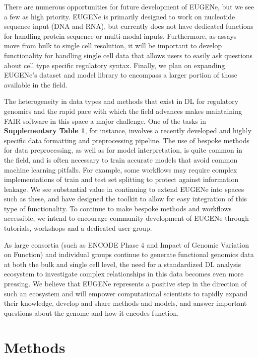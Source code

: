 There are numerous opportunities for future development of EUGENe, but we see a few as high priority. EUGENe is primarily designed to work on nucleotide sequence input (DNA and RNA), but currently does not have dedicated functions for handling protein sequence or multi-modal inputs. Furthermore, as assays move from bulk to single cell resolution, it will be important to develop functionality for handling single cell data that allows users to easily ask questions about cell type specific regulatory syntax. Finally, we plan on expanding EUGENe’s dataset and model library to encompass a larger portion of those available in the field.

The heterogeneity in data types and methods that exist in DL for regulatory genomics and the rapid pace with which the field advances makes maintaining FAIR software in this space a major challenge. One of the tasks in \textbf{Supplementary Table 1}, for instance, involves a recently developed and highly specific data formatting and preprocessing pipeline\cite{Bravo_Gonzalez-Blas2019-fq}. The use of bespoke methods for data preprocessing, as well as for model interpretation, is quite common in the field, and is often necessary to train accurate models that avoid common machine learning pitfalls\cite{Whalen2021-fh}. For example, some workflows may require complex implementations of train and test set splitting to protect against information leakage\cite{Urban2020-ij}. We see substantial value in continuing to extend EUGENe into spaces such as these, and have designed the toolkit to allow for easy integration of this type of functionality. To continue to make bespoke methods and workflows accessible, we intend to encourage community development of EUGENe through tutorials, workshops and a dedicated user-group.

As large consortia (such as ENCODE Phase 4 and Impact of Genomic Variation on Function) and individual groups continue to generate functional genomics data at both the bulk and single cell level, the need for a standardized DL analysis ecosystem to investigate complex relationships in this data becomes even more pressing. We believe that EUGENe represents a positive step in the direction of such an ecosystem and will empower computational scientists to rapidly expand their knowledge, develop and share methods and models, and answer important questions about the genome and how it encodes function.


\section{Methods}


